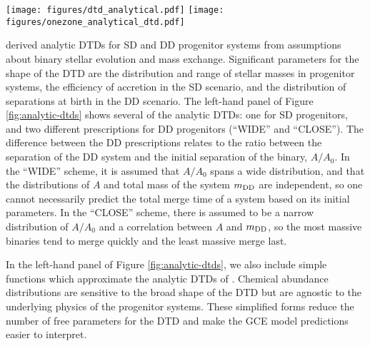 \documentclass[twocolumn,twocolappendix,linenumbers]{aastex631}
\begin{document}
\begin{figure*}
    \centering
    \texttt{[image: figures/dtd\_analytical.pdf]}
    \texttt{[image: figures/onezone\_analytical\_dtd.pdf]}
    \caption{\textit{Left:} Analytic DTDs from \citet[][solid curves]{Greggio2005-AnalyticalRates} and simplified approximations thereof (dashed curves; see Section \ref{sec:dtd-models}). Some functions are presented with a constant multiplicative factor for visual clarity. \textit{Right:} Abundance tracks and distributions from one-zone models with the analytic and simple DTDs (same color scheme). For visual clarity, we vary the mass-loading factor to be $\eta=4$, $\eta=2$, and $\eta=1$ for the red, green, and blue curves, respectively. All other model parameters are identical.}
    \label{fig:analytic-dtds}
\end{figure*}

\citet{Greggio2005-AnalyticalRates} derived analytic DTDs for SD and DD progenitor systems from assumptions about binary stellar evolution and mass exchange. Significant parameters for the shape of the DTD are the distribution and range of stellar masses in progenitor systems, the efficiency of accretion in the SD scenario, and the distribution of separations at birth in the DD scenario. The left-hand panel of Figure \ref{fig:analytic-dtds} shows several of the \citet{Greggio2005-AnalyticalRates} analytic DTDs: one for SD progenitors, and two different prescriptions for DD progenitors (``WIDE'' and ``CLOSE''). The difference between the DD prescriptions relates to the ratio between the separation of the DD system and the initial separation of the binary, $A/A_0$. In the ``WIDE'' scheme, it is assumed that $A/A_0$ spans a wide distribution, and that the distributions of $A$ and total mass of the system $m_{\rm DD}$ are independent, so one cannot necessarily predict the total merge time of a system based on its initial parameters. In the ``CLOSE'' scheme, there is assumed to be a narrow distribution of $A/A_0$ and a correlation between $A$ and $m_{\rm DD}$, so the most massive binaries tend to merge quickly and the least massive merge last.

In the left-hand panel of Figure \ref{fig:analytic-dtds}, we also include simple functions which approximate the analytic DTDs of \citet{Greggio2005-AnalyticalRates}. Chemical abundance distributions are sensitive to the broad shape of the DTD but are agnostic to the underlying physics of the progenitor systems. These simplified forms reduce the number of free parameters for the DTD and make the GCE model predictions easier to interpret.
\end{document}
